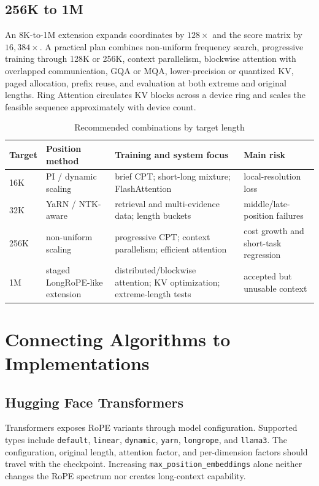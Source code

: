\documentclass[UTF8,10pt,a4paper,fontset=none]{ctexart}
\begin{document}
\subsection{256K to 1M}
An 8K-to-1M extension expands coordinates by $128\times$ and the score matrix by $16{,}384\times$. A practical plan combines non-uniform frequency search, progressive training through 128K or 256K, context parallelism, blockwise attention with overlapped communication, GQA or MQA, lower-precision or quantized KV, paged allocation, prefix reuse, and evaluation at both extreme and original lengths. Ring Attention circulates KV blocks across a device ring and scales the feasible sequence approximately with device count\cite{liu2023ring}.

\begin{table}[htbp]
\centering\small
\caption{Recommended combinations by target length}
\begin{tabularx}{\textwidth}{p{1.5cm}p{3cm}X X}
\toprule
Target & Position method & Training and system focus & Main risk\\
\midrule
16K & PI / dynamic scaling & brief CPT; short-long mixture; FlashAttention & local-resolution loss\\
32K & YaRN / NTK-aware & retrieval and multi-evidence data; length buckets & middle/late-position failures\\
256K & non-uniform scaling & progressive CPT; context parallelism; efficient attention & cost growth and short-task regression\\
1M & staged LongRoPE-like extension & distributed/blockwise attention; KV optimization; extreme-length tests & accepted but unusable context\\
\bottomrule
\end{tabularx}
\end{table}

\section{Connecting Algorithms to Implementations}

\subsection{Hugging Face Transformers}
Transformers exposes RoPE variants through model configuration. Supported types include \texttt{default}, \texttt{linear}, \texttt{dynamic}, \texttt{yarn}, \texttt{longrope}, and \texttt{llama3}\cite{hfrope}. The configuration, original length, attention factor, and per-dimension factors should travel with the checkpoint. Increasing \texttt{max\_position\_embeddings} alone neither changes the RoPE spectrum nor creates long-context capability.
\end{document}
